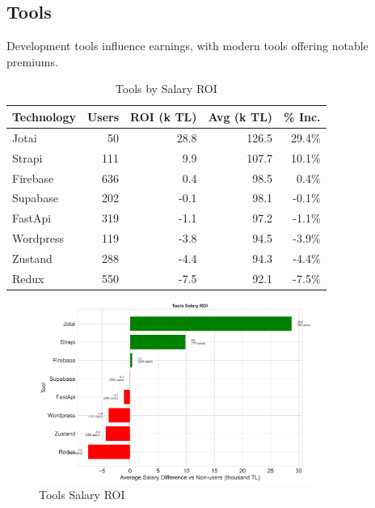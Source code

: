\documentclass[12pt,a4paper]{article}
\begin{document}
\subsection{Tools}
Development tools influence earnings, with modern tools offering notable premiums.

\begin{table}[H]
	\centering
	\small
	\begin{tabular}{lrrrr}
		\toprule
		\textbf{Technology} & \textbf{Users} & \textbf{ROI (k TL)} & \textbf{Avg (k TL)} & \textbf{\% Inc.} \\
		\midrule
		Jotai               & 50             & 28.8                & 126.5               & 29.4\%           \\
		Strapi              & 111            & 9.9                 & 107.7               & 10.1\%           \\
		Firebase            & 636            & 0.4                 & 98.5                & 0.4\%            \\
		Supabase            & 202            & -0.1                & 98.1                & -0.1\%           \\
		FastApi             & 319            & -1.1                & 97.2                & -1.1\%           \\
		Wordpress           & 119            & -3.8                & 94.5                & -3.9\%           \\
		Zustand             & 288            & -4.4                & 94.3                & -4.4\%           \\
		Redux               & 550            & -7.5                & 92.1                & -7.5\%           \\
		\bottomrule
	\end{tabular}
	\caption{Tools by Salary ROI}
\end{table}

\begin{figure}[H]
	\centering
	\includegraphics[width=0.8\textwidth]{figures/barplot_tools_roi.png}
	\caption{Tools Salary ROI}
\end{figure}
\end{document}
